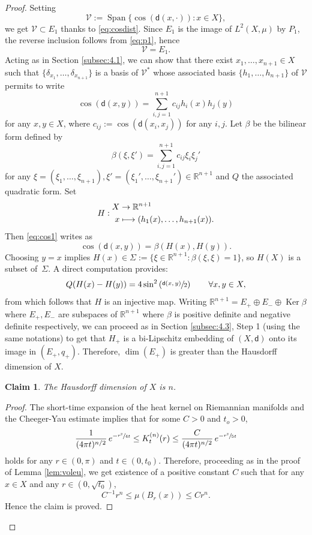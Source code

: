 \documentclass[JEP,XML,SOM,Unicode,published]{cedram}
\newcommand\mto{\mathchoice{\longmapsto}{\mapsto}{\mapsto}{\mapsto}}
\DeclareMathOperator{\Ker}{Ker}
\let\sep:
\theoremstyle{plain}
\newtheorem{claim}[theorem]{Claim}
\theoremstyle{definition}
\newcommand{\setR}{\mathbb{R}}
\newcommand{\cV}{\mathcal{V}}
\newcommand{\dist}{\mathsf{d}}
\DeclareMathOperator{\Span}{Span}
\begin{document}
\begin{proof}
Setting
\[
\cV:=\Span\{\cos(\dist(x,\cdot)): x \in X\},
\]
we get $\cV \subset E_1$ thanks to \eqref{eq:cosdist}. Since $E_1$ is the image of $L^2(X,\mu)$ by $P_1$, the reverse inclusion follows from \eqref{eq:p1}, hence
\[
\cV=E_1.
\]
Acting as in Section \ref{subsec:4.1}, we can show that there exist $x_1, \ldots, x_{n+1} \in X$ such that $\{\delta_{x_1},\ldots,\delta_{x_{n+1}}\}$ is a basis of $\cV^*$ whose associated basis $\{h_1,\ldots,h_{n+1}\}$ of $\cV$ permits to write
\begin{equation}\label{eq:cos1}
\cos(\dist(x,y)) = \sum_{i,j=1}^{n+1} c_{ij} h_i(x) h_j(y)
\end{equation}
for any $x,y \in X$, where $c_{ij}:=\cos(\dist(x_i,x_j))$ for any $i,j$. Let $\beta$ be the bilinear form defined by
\[
\beta(\xi,\xi') = \sum_{i,j=1}^{n+1} c_{ij}\xi_i \xi_j'
\]
for any $\xi=(\xi_1,\dots,\xi_{n+1}), \xi'=(\xi_1',\dots,\xi_{n+1}') \in \setR^{n+1}$ and $Q$ the associated quadratic form. Set
\[
H:
\begin{aligned}
X & \to \setR^{n+1}\\
x & \mto (h_1(x),\ldots,h_{n+1}(x)).
\end{aligned}
\]
Then \eqref{eq:cos1} writes as
\begin{equation}\label{eq:cos2}
\cos(\dist(x,y)) = \beta(H(x),H(y)).
\end{equation}
Choosing $y=x$ implies $H(x) \in \Sigma:=\{\xi \in \setR^{n+1} \sep \beta(\xi,\xi) =1\}$, so $H(X)$ is a subset of~$\Sigma$. A direct computation provides:
\begin{equation}\label{eq:cos3}
Q(H(x)-H(y))=4\sin^2\left(\sfrac{\dist(x,y)}{2}\right) \qquad \forall x,y \in X,
\end{equation}
from which follows that $H$ is an injective map. Writing $
\setR^{n+1} = E_+ \oplus E_- \oplus \Ker \beta$ where $E_+, E_-$ are subspaces of $\setR^{n+1}$ where $\beta$ is positive definite and negative definite respectively, we can proceed as in Section \ref{subsec:4.3}, Step 1 (using the same notations) to get that $H_+$ is a bi-Lipschitz embedding of $(X,\dist)$ onto its image in $(E_+,q_+)$. Therefore, $\dim(E_+)$ is greater than the Hausdorff dimension of $X$.

\begin{claim}
The Hausdorff dimension of $X$ is $n$.
\end{claim}

\begin{proof}
The short-time expansion of the heat kernel on Riemannian manifolds \cite{MinakshisundaramPleijel} and the Cheeger-Yau estimate \cite{CheegerYau} implies that for some $C>0$ and $t_o>0$,
\[
\frac{1}{(4\pi t)^{n/2}}\, e^{-\sfrac{r^2}{4t}} \le K_t^{(n)}(r) \le \frac{C}{(4\pi t)^{n/2}}\, e^{-\sfrac{r^2}{5t}}
\]
holds for any $r \in (0,\pi)$ and $t\in (0,t_0)$. Therefore, proceeding as in the proof of Lemma \ref{lem:voleu}, we get existence of a positive constant $C$ such that for any $x \in X$ and any $r\in (0,\sqrt{t_0})$,
\[
C^{-1}r^n\le \mu(B_r(x))\le C r^n.
\]
Hence the claim is proved.
\end{proof}


\end{proof}
\end{document}
